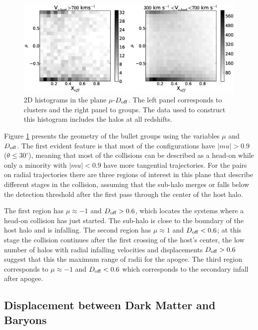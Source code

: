\documentclass{emulateapj}
\begin{document}
\begin{figure}
\begin{center}
\includegraphics[width=1.0\textwidth]{figure_4.eps}
\end{center}
\caption{2D histograms in the plane $\mu$-$D_{\rm off}$. The left
  panel corresponds to clusters and the right panel to groups. The data
  used to construct this histogram includes the halos at all redshifts.}
\label{fig:geometry}
\end{figure}


Figure \ref{fig:geometry} presents the geometry of the bullet groups using the 
variables $\mu$ and $D_{\rm off}$. The first evident feature is that
most of the configurations have $|mu|>0.9$ ($\theta\leq 30^{\circ}$),
meaning that most of the collisions can be described as a head-on while
only a minority with $|mu|<0.9$ have more tangential trajectories. For
the pairs on radial trajectories there are three regions of interest
in this plane that describe different stages in the collision,
assuming that the sub-halo merges or falls below the detection
threshold after the first pass through the center of the host halo.


The first region has $\mu\approx-1$ and $D_{\rm off}>0.6$, which
locates the systems where a head-on collision has just started. The
sub-halo is close to the boundary of the host halo and is
infalling. The second region has $\mu\approx 1$ and $D_{\rm off}<0.6$;
at this stage the collision continues after the first crossing of the
host's center, the low number of halos with radial infalling velocities
and displacements $D_{\rm off}>0.6$ suggest that this the maximum
range of radii for the apogee.  The third region corresponds to
$\mu\approx-1$ and $D_{\rm off}<0.6$ which corresponds to the
secondary infall after apogee. 



\subsection{Displacement between Dark Matter and Baryons}
\label{sec:baryonic_displacements}
\end{document}
